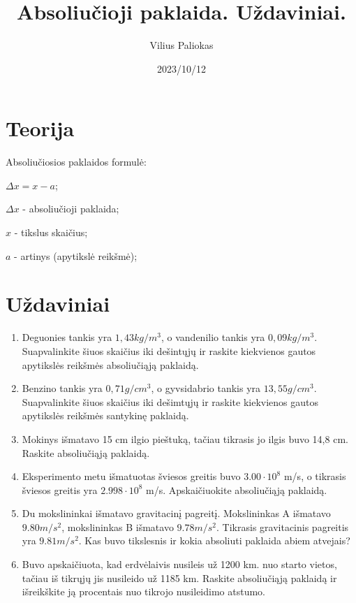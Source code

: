 \documentclass[32pt,a4paper]{article}
\title{Absoliučioji paklaida. Uždaviniai.}
\author{Vilius Paliokas}
\date{2023/10/12}
\begin{document}
\maketitle

\section*{Teorija}

Absoliučiosios paklaidos formulė:

$\Delta x=x-a$;

$\Delta x$ - absoliučioji paklaida;

$x$ - tikslus skaičius;

$a$ - artinys (apytikslė reikšmė);

\section*{Uždaviniai}

\begin{enumerate}
    \item Deguonies tankis yra $1,43 kg/m^{3}$, o vandenilio tankis yra $0,09
              kg/m^3$. Suapvalinkite šiuos skaičius iki dešintųjų ir raskite
          kiekvienos
          gautos apytikslės reikšmės absoliučiąją paklaidą.
    \item Benzino tankis yra $0,71 g/cm^{3}$, o gyvsidabrio tankis yra $13,55
              g/cm^{3}$. Suapvalinkite šiuos skaičius iki dešimtųjų ir raskite kiekvienos
          gautos apytikslės reikšmės santykinę paklaidą.
    \item Mokinys išmatavo 15 cm ilgio pieštuką, tačiau tikrasis jo ilgis buvo
          14,8 cm. Raskite absoliučiąją paklaidą.
    \item Eksperimento metu išmatuotas šviesos greitis buvo $3.00 \cdot 10^{8}$
          m/s, o tikrasis šviesos greitis yra $2.998 \cdot 10^{8}$ m/s.
          Apskaičiuokite absoliučiąją paklaidą.
    \item Du mokslininkai išmatavo gravitacinį pagreitį. Mokslininkas A
          išmatavo $9.80 m/s^{2}$, mokslininkas B išmatavo $9.78 m/s^2$.
          Tikrasis
          gravitacinis pagreitis yra $9.81 m/s^2$. Kas buvo tikslesnis ir kokia
          absoliuti paklaida abiem atvejais?
    \item Buvo apskaičiuota, kad erdvėlaivis nusileis už 1200 km. nuo
          starto vietos, tačiau iš tikrųjų jis nusileido už 1185 km. Raskite
          absoliučiąją paklaidą ir išreikškite ją procentais nuo tikrojo
          nusileidimo
          atstumo.
\end{enumerate}
\end{document}
